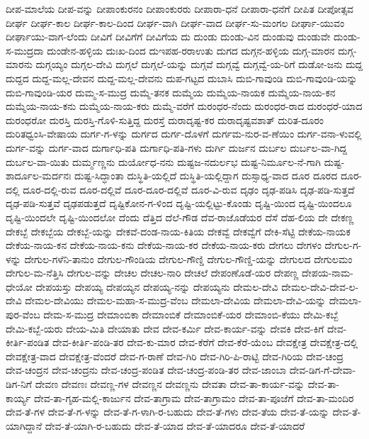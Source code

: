 ದೀಪ-ಮಾಲೆಯ
ದೀಪ-ವನ್ನು
ದೀಪಾಂಕುರನಂ
ದೀಪಾಂಕುರರು
ದೀಪಾರಾ-ಧನೆ
ದೀಪಾರಾ-ಧನೆಗೆ
ದೀಪಿತ
ದೀಪೋತ್ಸವ
ದೀರ್ಘ
ದೀರ್ಘ-ಕಾಲ
ದೀರ್ಘ-ಕಾಲ-ದಿಂದ
ದೀರ್ಘ-ವಾಗಿ
ದೀರ್ಘ-ವಾದ
ದೀರ್ಘ-ಸು-ಮಂಗಲ
ದೀರ್ಘಾ-ಯುವಂ
ದೀರ್ಘಾಯು-ವಾಗ-ಲೆಂದು
ದೀವಿಗೆ
ದೀವಿಗೆಗೆ
ದೀವಿಗೆಯ
ದು
ದುಂಡು
ದುಂಡು-ವಿನ
ದುಂಡುವು
ದುಂಡುವೇ
ದುಂಡು-ಸ-ಮುದ್ರದಾ
ದುಂಡೇನ-ಹಳ್ಳಿಯ
ದುಃಖ-ದಿಂದ
ದುಇಪಹ-ರರಾಉತು
ದುಗದ
ದುಗ್ಗನ-ಹಳ್ಳಿಯ
ದುಗ್ಗ-ಮಾರನ
ದುಗ್ಗ-ಮಾರನು
ದುಗ್ಗಯ್ಯಂ
ದುಗ್ಗಲ-ದೇವಿ
ದುಗ್ಗಲೆ
ದುಗ್ಗಲೆ-ಯನ್ನು
ದುಗ್ಗವೆ
ದುಗ್ಗವ್ವೆ
ದುಗ್ಗವ್ವೆ-ಯ-ರಿಗೆ
ದುಡೋ-ಜನು
ದುದ್ದ
ದುದ್ದದ
ದುದ್ದ-ಮಲ್ಲ-ದೇವನ
ದುದ್ದ-ಮಲ್ಲ-ದೇವನು
ದುಪ-ಗಟ್ಟದ
ದುಬಾಸಿ
ದುಬಿ-ಗಾವುಂಡಿ
ದುಬಿ-ಗಾವುಂಡಿ-ಯನ್ನು
ದುಬಿ-ಗಾವುಂಡಿ-ಯರ
ದುಮ್ಮ-ಸ-ಮುದ್ರ
ದುಮ್ಮೆ-ತನಕ
ದುಮ್ಮೆಯ
ದುಮ್ಮೆಯ-ನಾಯಕ
ದುಮ್ಮೆಯ-ನಾಯ-ಕನ
ದುಮ್ಮೆಯ-ನಾಯ-ಕನು
ದುಮ್ಮೆಯ-ನಾಯ-ಕರು
ದುಮ್ಮೆ-ವರೆಗೆ
ದುರಂಧರ-ನೆಂದು
ದುರಂಧರ-ರಾದ
ದುರಂಧರೆ-ಯಾದ
ದುರಂಧರೋ
ದುರಸ್ತಿ
ದುರಸ್ತಿ-ಗೊಳಿ-ಸುತ್ತಿದ್ದ
ದುರಸ್ತೆ
ದುರಾದೃಷ್ಟ-ಕರ
ದುರಾದೃಷ್ಟವಶಾತ್
ದುರಿತ-ದೂರಂ
ದುರಿತಧ್ವಂಸಿ-ವೇಷಾಯ
ದುರ್ಗ-ಗ-ಳನ್ನು
ದುರ್ಗದ
ದುರ್ಗ-ದೊಳಗೆ
ದುರ್ಗಮ-ನುರ-ವ-ಣೆಯಿಂ
ದುರ್ಗ-ವನಾ-ಳುವಲ್ಲಿ
ದುರ್ಗ-ವನ್ನು
ದುರ್ಗ-ವಾದ
ದುರ್ಗಾಧಿ-ಪತಿ
ದುರ್ಗಾಧಿ-ಪತಿ-ಗಳು
ದುರ್ಗಿ
ದುರ್ಜನ
ದುರ್ಬಲ
ದುರ್ಬಲ-ವಾ-ಗಿದ್ದ
ದುರ್ಬಲ-ವಾ-ಯಿತು
ದುರ್ಮ್ಮಣ್ಣನು
ದುರ್ಯೋಧ-ನನು
ದುಷ್ಟಜ-ನದುರ್ಲಭ
ದುಷ್ಟ-ನಿರ್ಮೂಲ-ನೆ-ಗಾಗಿ
ದುಷ್ಟ-ಶಾರ್ದೂಲ-ಮರ್ದನಃ
ದುಷ್ಟ-ಸಿದ್ಧಾಂತಾ
ದುಸ್ಥಿತಿ-ಯಲ್ಲಿದೆ
ದುಸ್ಥಿತಿ-ಯಲ್ಲಿದ್ದಾಗ
ದುಸ್ಸಾಧ್ಯ-ವಾದ
ದೂರ
ದೂರದ
ದೂರ-ದಲ್ಲಿ
ದೂರ-ದಲ್ಲಿ-ರುವ
ದೂರ-ದಲ್ಲಿವೆ
ದೂರ-ದೂರ-ದಲ್ಲಿವೆ
ದೂರ-ವಿ-ರುವ
ದೃಢಂ
ದೃಢ-ಪಡಿಸಿ
ದೃಢ-ಪಡಿ-ಸುತ್ತದೆ
ದೃಢ-ಪಡಿ-ಸುತ್ತವೆ
ದೃಢಪಡುತ್ತದೆ
ದೃಷ್ಟಿಕೋನ-ಗ-ಳಿಂದ
ದೃಷ್ಟಿ-ಯಲ್ಲಿಟ್ಟು-ಕೊಂಡು
ದೃಷ್ಟಿ-ಯಿಂದ
ದೃಷ್ಟಿ-ಯಿಂದಲೂ
ದೃಷ್ಟಿ-ಯಿಂದಲೇ
ದೃಷ್ಟಿ-ಯಿಂದಲೋ
ದೆಂದು
ದೆತ್ತಿದ
ದೆಲೆ-ಗೌಡ
ದೆವ-ರಾಜೊಡೆಯರ
ದೆಸೆ
ದೆಹ-ಲಿಯ
ದೇ
ದೇಕಣ್ಣ
ದೇಕಬ್ಬೆ
ದೇಕಬ್ಬೆಯ
ದೇಕಬ್ಬೆ-ಯನ್ನು
ದೇಕವೆ-ದಂಡ-ನಾಯ-ಕಿತಿಯ
ದೇಕವ್ವೆ
ದೇಕವ್ವೆಗೆ
ದೇಕಿ-ಸೆಟ್ಟಿ
ದೇಕೆಯ-ನಾಯಕ
ದೇಕೆಯ-ನಾಯ-ಕನ
ದೇಕೆಯ-ನಾಯ-ಕನು
ದೇಕೆಯ-ನಾಯ-ಕರ
ದೇಕೆಯ-ನಾಯ-ಕರು
ದೇಗಲು
ದೇಗಳಂ
ದೇಗುಲ-ಗ-ಳನ್ನು
ದೇಗುಲ-ಗಳೆನಿ-ತಾನುಂ
ದೇಗುಲ-ಗೌಂಡಿಯ
ದೇಗುಲ-ಗೌಣ್ಡಿ
ದೇಗುಲ-ಗೌಣ್ಡಿ-ಯನ್ನು
ದೇಗುಲದ
ದೇಗುಲಮಂ
ದೇಗುಲ-ಮ-ನೆತ್ತಿಸಿ
ದೇಗುಲ-ವನ್ನು
ದೇಚಲ
ದೇಚಲ-ನಾರಿ
ದೇಚಲೆ
ದೇಪಂಣೊಡೆ-ಯರ
ದೇಪಣ್ಣ
ದೇಪಯ-ನಾಮ-ಧೇಯೋ
ದೇಪಯಸ್ತು
ದೇಪಯ್ಯ
ದೇಪಯ್ಯನ
ದೇಪಯ್ಯ-ನನ್ನು
ದೇಪಯ್ಯನು
ದೇಮಲ-ದೇವಿ
ದೇಮಲ-ದೇವಿ-ದೇವ-ಲ-ದೇವಿ
ದೇಮಲ-ದೇವಿಯು
ದೇಮಲ-ಮಹಾ-ಸ-ಮುದ್ರ-ವೆಂಬ
ದೇಮಲಾ-ದೇವಿಯ
ದೇಮಲಾ-ದೇವಿ-ಯನ್ನು
ದೇಮಲಾ-ಪುರ-ವೆಂಬ
ದೇಮ-ಸ-ಮುದ್ರ
ದೇಮಾಂಬಿಕಾ
ದೇಮಾಂಬಿಕೆ
ದೇಮಾಂಬಿಕೆ-ಯರ
ದೇಮಾಂಬಿ-ಕೆಯು
ದೇಮಿ-ಕಬ್ಬೆ
ದೇಮಿ-ಕಬ್ಬೆ-ಯರು
ದೇಯ-ಮಿತಿ
ದೇಯಾತು
ದೇವ
ದೇವ-ಕರ್ಮಿ
ದೇವ-ಕಾರ್ಯ-ವನ್ನು
ದೇವಕಿ
ದೇವ-ಕಿಗೆ
ದೇವ-ಕೀರ್ತಿ-ಪಂಡಿತ
ದೇವ-ಕೀರ್ತಿ-ಪಂಡಿ-ತರ
ದೇವ-ಕು-ಮಾರ
ದೇವ-ಕೆರೆಗೆ
ದೇವ-ಕೆರೆ-ಯೆಂಬ
ದೇವಕ್ಷೇತ್ರ
ದೇವಕ್ಷೇತ್ರ-ದಲ್ಲಿ
ದೇವಕ್ಷೇತ್ರ-ವಾದ
ದೇವಕ್ಷೇತ್ರ-ವೆಂದರೆ
ದೇವ-ಗ-ರಾಣೆ
ದೇವ-ಗಿರಿ
ದೇವ-ಗಿರಿ-ಪಿ-ರಾಟ್ಟಿ
ದೇವ-ಗಿರಿಯ
ದೇವ-ಚಂದ್ರ
ದೇವ-ಚಂದ್ರನ
ದೇವ-ಚಂದ್ರನು
ದೇವ-ಚಂದ್ರ-ಪಂಡಿತ
ದೇವ-ಚಂದ್ರ-ಪಂಡಿ-ತರ
ದೇವ-ಜಾಂಬಾ
ದೇವ-ಡಿಗ-ಗೆ-ದೇವಾ-ಡಿಗ-ನಿಗೆ
ದೇವಣ
ದೇವಣಃ
ದೇವಣ್ಣ-ಗಳ
ದೇವಣ್ಣನ
ದೇವಣ್ಣನು
ದೇವತಾ
ದೇವ-ತಾ-ಕಾರ್ಯ-ವನ್ನು
ದೇವ-ತಾ-ಕಾರ್ಯ್ಯ
ದೇವ-ತಾ-ಗೃಹ-ಮಲ್ಲಿ-ಕಾರ್ಜುನ
ದೇವ-ತಾಗ್ರಾಮ
ದೇವ-ತಾಗ್ರಾಮಂ
ದೇವ-ತಾ-ಪೂಜೆಗೆ
ದೇವ-ತಾ-ಮಂದಿರ
ದೇವ-ತೆ-ಗಳ
ದೇವ-ತೆ-ಗ-ಳನ್ನು
ದೇವ-ತೆ-ಗ-ಳಾಗಿ-ರ-ಬಹುದು
ದೇವ-ತೆ-ಗಳು
ದೇವ-ತೆಯ
ದೇವ-ತೆ-ಯನ್ನು
ದೇವ-ತೆ-ಯಾಗಿದ್ದಾನೆ
ದೇವ-ತೆ-ಯಾಗಿ-ರ-ಬಹುದು
ದೇವ-ತೆ-ಯಾದ
ದೇವ-ತೆ-ಯಾದರೂ
ದೇವ-ತೆ-ಯಾದರೆ
